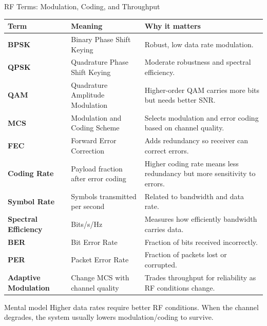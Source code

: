 \documentclass[aspectratio=169]{beamer}
\begin{document}
\begin{frame}{RF Terms: Modulation, Coding, and Throughput}
\tiny
\begin{tabular}{p{2.0cm} p{3.4cm} p{6.7cm}}
\toprule
\textbf{Term} & \textbf{Meaning} & \textbf{Why it matters} \\
\midrule
\textbf{BPSK} & Binary Phase Shift Keying & Robust, low data rate modulation. \\
\textbf{QPSK} & Quadrature Phase Shift Keying & Moderate robustness and spectral efficiency. \\
\textbf{QAM} & Quadrature Amplitude Modulation & Higher-order QAM carries more bits but needs better SNR. \\
\textbf{MCS} & Modulation and Coding Scheme & Selects modulation and error coding based on channel quality. \\
\textbf{FEC} & Forward Error Correction & Adds redundancy so receiver can correct errors. \\
\textbf{Coding Rate} & Payload fraction after error coding & Higher coding rate means less redundancy but more sensitivity to errors. \\
\textbf{Symbol Rate} & Symbols transmitted per second & Related to bandwidth and data rate. \\
\textbf{Spectral Efficiency} & Bits/s/Hz & Measures how efficiently bandwidth carries data. \\
\textbf{BER} & Bit Error Rate & Fraction of bits received incorrectly. \\
\textbf{PER} & Packet Error Rate & Fraction of packets lost or corrupted. \\
\textbf{Adaptive Modulation} & Change MCS with channel quality & Trades throughput for reliability as RF conditions change. \\
\bottomrule
\end{tabular}

\vspace{0.15cm}
\begin{block}{Mental model}
Higher data rates require better RF conditions. When the channel degrades, the system usually lowers modulation/coding to survive.
\end{block}
\end{frame}
\end{document}
